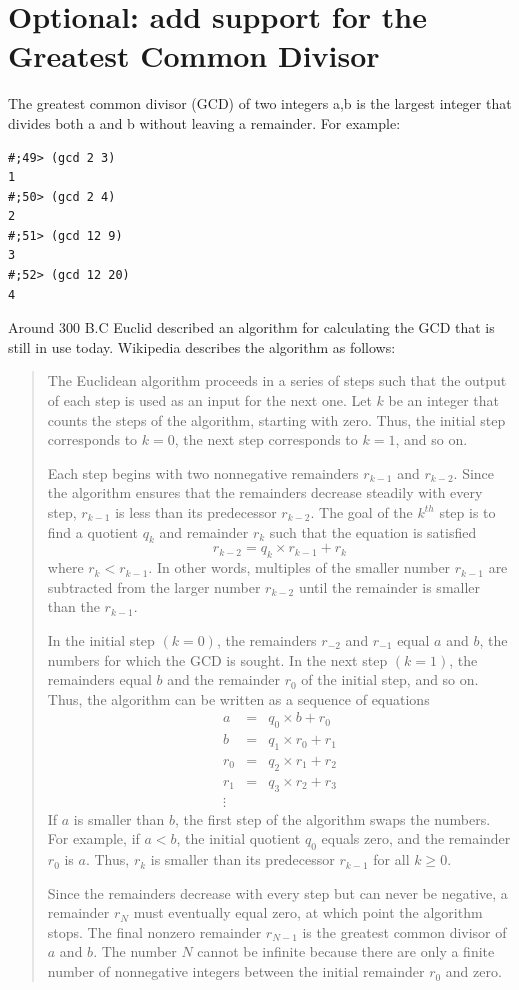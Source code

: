\documentclass[12pt,a4paper,english,twoside]{article}
\begin{document}
\section{Optional: add support for the Greatest Common Divisor}
The greatest common divisor (GCD) of two integers a,b is the largest integer that 
divides both a and b without leaving a remainder. For example: 
\begin{lstlisting}
#;49> (gcd 2 3)
1
#;50> (gcd 2 4)
2
#;51> (gcd 12 9)
3
#;52> (gcd 12 20)
4
\end{lstlisting}
Around 300 B.C Euclid described an algorithm for calculating the GCD that is 
still in use today. Wikipedia \cite{euclid} describes the algorithm  as follows:
\begin{quote}
 The Euclidean algorithm proceeds in a series of steps such that the output of 
 each step is used as an input for the next one. Let $k$ be an integer that 
 counts the steps of the algorithm, starting with zero. Thus, the initial step 
 corresponds to $k = 0$, the next step corresponds to $k = 1$, and so on.

 Each step begins with two nonnegative remainders $r_{k-1}$ and $r_{k-2}$. Since 
 the algorithm ensures that the remainders decrease steadily with every step, 
 $r_{k-1}$ is less than its predecessor $r_{k-2}$. The goal of the $k^{th}$ step is to find a 
 quotient $q_{k}$ and remainder $r_{k}$ such that the equation is satisfied
 \begin{equation*}
   r_{k-2} = q_{k} \times r_{k-1} + r_{k}
\end{equation*}
where $r_{k} < r_{k-1}$. In other words, multiples of the smaller number 
$r_{k-1}$ are subtracted from the larger number $r_{k-2}$ until the remainder 
is smaller than the $r_{k-1}$.

In the initial step $(k = 0)$, the remainders $r_{-2}$ and $r_{-1}$ equal $a$ and $b$, the 
numbers for which the GCD is sought. In the next step $(k = 1)$, the remainders 
equal $b$ and the remainder $r_{0}$ of the initial step, and so on. Thus, the 
algorithm can be written as a sequence of equations
\begin{eqnarray*}
  a &=& q_{0} \times b + r_{0} \\
  b &=& q_{1} \times r_{0} + r_{1} \\
  r_{0} &=& q_{2} \times  r_{1} + r_{2} \\
  r_{1} &=& q_{3} \times r_{2} + r_{3} \\
\vdots
\end{eqnarray*}
If $a$ is smaller than $b$, the first step of the algorithm swaps the numbers. For 
example, if $a < b$, the initial quotient $q_{0}$ equals zero, and the remainder $r_{0}$ 
is $a$. Thus, $r_{k}$ is smaller than its predecessor $r_{k-1}$ for all $k \geq 0$.

Since the remainders decrease with every step but can never be negative, a 
remainder $r_{N}$ must eventually equal zero, at which point the algorithm 
stops. The final nonzero remainder $r_{N-1}$ is the greatest common divisor of 
$a$ and $b$. The number $N$ cannot be infinite because there are only a finite 
number of nonnegative integers between the initial remainder $r_{0}$ and zero. 
\end{quote}
\end{document}

